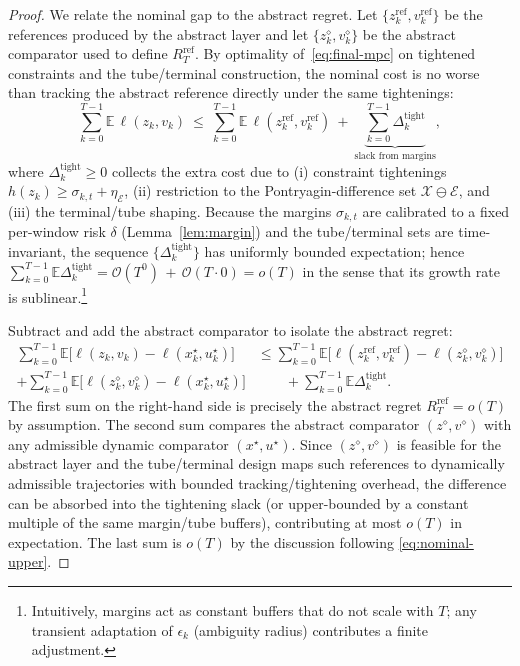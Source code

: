 \documentclass[journal]{IEEEtran}
\theoremstyle{definition}
\begin{document}
\begin{proof}
 
We relate the nominal gap to the abstract regret. Let $\{z_k^{\mathrm{ref}},v_k^{\mathrm{ref}}\}$ be the references produced by the abstract layer and let $\{z_k^\diamond,v_k^\diamond\}$ be the abstract comparator used to define $R_T^{\mathrm{ref}}$. By optimality of~\eqref{eq:final-mpc} on tightened constraints and the tube/terminal construction, the nominal cost is no worse than tracking the abstract reference directly under the same tightenings:
\begin{equation}
\sum_{k=0}^{T-1}\mathbb{E}\,\ell(z_k,v_k)
\ \le\ \sum_{k=0}^{T-1}\mathbb{E}\,\ell(z_k^{\mathrm{ref}},v_k^{\mathrm{ref}})
\ +\ \underbrace{\sum_{k=0}^{T-1}\Delta_k^{\mathrm{tight}}}_{\text{slack from margins}},
\label{eq:nominal-upper}
\end{equation}
where $\Delta_k^{\mathrm{tight}}\ge 0$ collects the extra cost due to (i) constraint tightenings $h(z_k)\ge \sigma_{k,t}{+}\eta_{\mathcal{E}}$, (ii) restriction to the Pontryagin-difference set $\mathcal{X}\ominus\mathcal{E}$, and (iii) the terminal/tube shaping. Because the margins $\sigma_{k,t}$ are calibrated to a fixed per-window risk $\delta$ (Lemma~\ref{lem:margin}) and the tube/terminal sets are time-invariant, the sequence $\{\Delta_k^{\mathrm{tight}}\}$ has uniformly bounded expectation; hence $\sum_{k=0}^{T-1}\mathbb{E}\Delta_k^{\mathrm{tight}} = \mathcal{O}(T^0)\,{+}\,\mathcal{O}(T\cdot 0)=o(T)$ in the sense that its growth rate is sublinear.\footnote{Intuitively, margins act as constant buffers that do not scale with $T$; any transient adaptation of $\epsilon_k$ (ambiguity radius) contributes a finite adjustment.}

Subtract and add the abstract comparator to isolate the abstract regret:
\begin{align}
\sum_{k=0}^{T-1}\mathbb{E}\big[\ell(z_k,v_k)-\ell(x_k^\star,u_k^\star)\big]
&\le \sum_{k=0}^{T-1}\mathbb{E}\big[\ell(z_k^{\mathrm{ref}},v_k^{\mathrm{ref}})-\ell(z_k^\diamond,v_k^\diamond)\big]\\
+ \sum_{k=0}^{T-1}\mathbb{E}\big[\ell(z_k^\diamond,v_k^\diamond)-\ell(x_k^\star,u_k^\star)\big] \nonumber 
&\qquad + \sum_{k=0}^{T-1}\mathbb{E}\Delta_k^{\mathrm{tight}}.
\label{eq:split-abstract}
\end{align}
The first sum on the right-hand side is precisely the abstract regret $R_T^{\mathrm{ref}}=o(T)$ by assumption.
The second sum compares the abstract comparator $(z^\diamond,v^\diamond)$ with any admissible dynamic comparator $(x^\star,u^\star)$. Since $(z^\diamond,v^\diamond)$ is feasible for the abstract layer and the tube/terminal design maps such references to dynamically admissible trajectories with bounded tracking/tightening overhead, the difference can be absorbed into the tightening slack (or upper-bounded by a constant multiple of the same margin/tube buffers), contributing at most $o(T)$ in expectation. The last sum is $o(T)$ by the discussion following \eqref{eq:nominal-upper}.
 

\end{proof}
\end{document}
